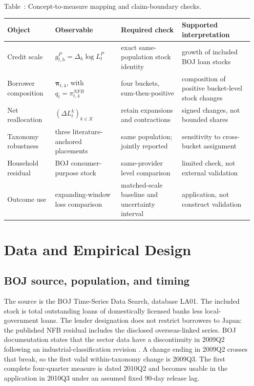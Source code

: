 \documentclass[11pt]{article}
\begin{document}
\begin{center}
  \label{tab:theory_measure}
  \small Table~\thetable: Concept-to-measure mapping and claim-boundary checks.

  \smallskip
  \footnotesize
  \begin{tabular}{@{}p{}p{}p{}p{}@{}}
    \toprule
    Object & Observable & Required check & Supported interpretation \\
    \midrule
    Credit scale &
      \(g_{t,h}^P=\Delta_h\log L_t^P\) &
      exact same-population stock identity &
      growth of included BOJ loan stocks \\
    Borrower composition &
      \(\boldsymbol{\pi}_{t,4}\), with \(q_t=\pi_{t,4}^{NFB}\) &
      four buckets, sum-then-positive &
      composition of positive bucket-level stock changes \\
    Net reallocation &
      \((\Delta L_t^k)_{k\in\mathcal K}\) &
      retain expansions and contractions &
      signed changes, not bounded shares \\
    Taxonomy robustness &
      three literature-anchored placements &
      same population; jointly reported &
      sensitivity to cross-bucket assignment \\
    Household residual &
      BOJ consumer-purpose stock &
      same-provider level comparison &
      limited check, not external validation \\
    Outcome use &
      expanding-window loss comparison &
      matched-scale baseline and uncertainty interval &
      application, not construct validation \\
    \bottomrule
  \end{tabular}
\end{center}

\section{Data and Empirical Design}

\subsection{BOJ source, population, and timing}

The source is the BOJ Time-Series Data Search, database LA01. The included stock
is total outstanding loans of domestically licensed banks less
local-government loans. The lender designation does not restrict borrowers to
Japan: the published NFB residual includes the disclosed overseas-linked
series. BOJ documentation states that the sector data have a discontinuity in
2009Q2 following an industrial-classification revision
\citep{BOJStatisticsNotes}. A change ending in 2009Q2 crosses that break, so
the first valid within-taxonomy change is 2009Q3. The first complete
four-quarter measure is dated 2010Q2 and becomes usable in the application in
2010Q3 under an assumed fixed 90-day release lag.
\end{document}
